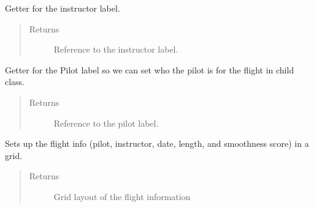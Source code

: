 \documentclass[letterpaper,10pt,english]{sphinxmanual}
\begin{document}
\begin{fulllineitems}
\begin{fulllineitems}
\begin{quote}
\begin{description}
\end{description}\end{quote}

\end{fulllineitems}


\begin{fulllineitems}
\label{\detokenize{index:src.Views.View_ReportScreen.ReportWindow.set_LblInstructor}}
Getter for the instructor label.
\begin{quote}\begin{description}
\item[{Returns}] \leavevmode
Reference to the instructor label.

\end{description}\end{quote}

\end{fulllineitems}


\begin{fulllineitems}
\label{\detokenize{index:src.Views.View_ReportScreen.ReportWindow.set_LblPilot}}
Getter for the Pilot label so we can set who the pilot is for the flight in child class.
\begin{quote}\begin{description}
\item[{Returns}] \leavevmode
Reference to the pilot label.

\end{description}\end{quote}

\end{fulllineitems}


\begin{fulllineitems}
\label{\detokenize{index:src.Views.View_ReportScreen.ReportWindow.setupFlightInfo}}
Sets up the flight info (pilot, instructor, date, length, and smoothness score) in a grid.
\begin{quote}\begin{description}
\item[{Returns}] \leavevmode
Grid layout of the flight information


\end{description}
\end{quote}
\end{fulllineitems}
\end{fulllineitems}
\end{document}
